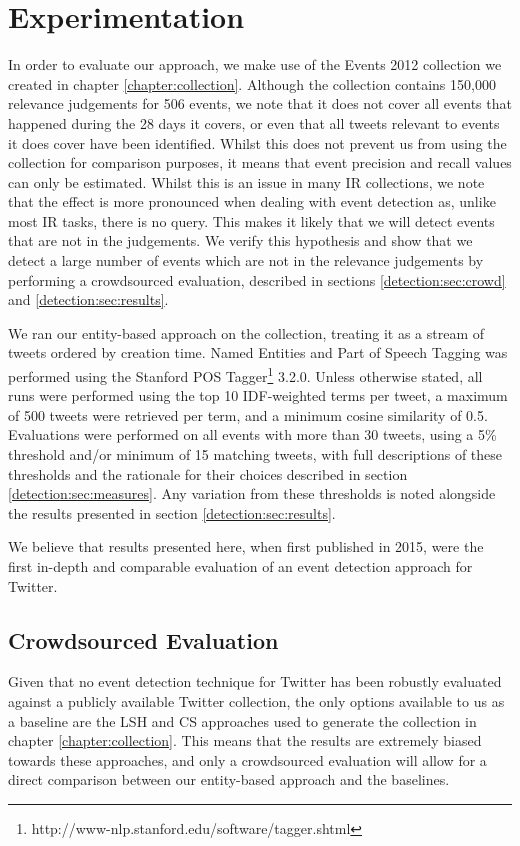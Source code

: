 
\section{Experimentation}
\label{detection:sec:experimentation}
In order to evaluate our approach, we make use of the Events 2012 collection we created in chapter \ref{chapter:collection}.
Although the collection contains 150,000 relevance judgements for 506 events, we note that it does not cover all events that happened during the 28 days it covers, or even that all tweets relevant to events it does cover have been identified.
Whilst this does not prevent us from using the collection for comparison purposes, it means that event precision and recall values can only be estimated.
Whilst this is an issue in many IR collections, we note that the effect is more pronounced when dealing with event detection as, unlike most IR tasks, there is no query.
This makes it likely that we will detect events that are not in the judgements.
We verify this hypothesis and show that we detect a large number of events which are not in the relevance judgements by performing a crowdsourced evaluation, described in sections \ref{detection:sec:crowd} and \ref{detection:sec:results}.

We ran our entity-based approach on the collection, treating it as a stream of tweets ordered by creation time. Named Entities and Part of Speech Tagging was performed using the Stanford POS Tagger\footnote{http://www-nlp.stanford.edu/software/tagger.shtml} 3.2.0.
Unless otherwise stated, all runs were performed using the top 10 IDF-weighted terms per tweet, a maximum of 500 tweets were retrieved per term, and a minimum cosine similarity of 0.5.
Evaluations were performed on all events with more than 30 tweets, using a 5\% threshold and/or minimum of 15 matching tweets, with full descriptions of these thresholds and the rationale for their choices described in section \ref{detection:sec:measures}.
Any variation from these thresholds is noted alongside the results presented in section \ref{detection:sec:results}.

We believe that results presented here, when first published in 2015, were the first in-depth and comparable evaluation of an event detection approach for Twitter.

\subsection{Crowdsourced Evaluation}
\label{sec:baseline}
Given that no event detection technique for Twitter has been robustly evaluated against a publicly available Twitter collection, the only options available to us as a baseline are the LSH \citep{Petrovic10} and CS \citep{Aggarwal12} approaches used to generate the collection in chapter \ref{chapter:collection}.
This means that the results are extremely biased towards these approaches, and only a crowdsourced evaluation will allow for a direct comparison between our entity-based approach and the baselines.

